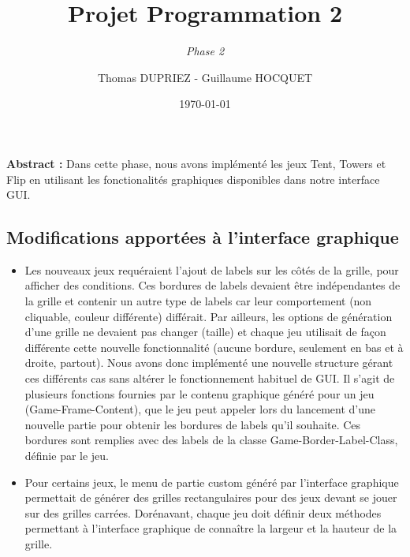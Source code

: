 \documentclass[a4paper]{article}
\title{Projet Programmation 2}
\subtitle{\emph{Phase 2}}
\author{Thomas DUPRIEZ - Guillaume HOCQUET}
\date{\today}
\begin{document}
\maketitle
\textbf{Abstract :} Dans cette phase, nous avons implémenté les jeux Tent, Towers et Flip en utilisant les fonctionalités graphiques disponibles dans notre interface GUI.

\subsection*{Modifications apportées à l'interface graphique}
\begin{itemize}
\item Les nouveaux jeux requéraient l'ajout de labels sur les côtés de la grille, pour afficher des conditions. Ces bordures de labels devaient être indépendantes de la grille et contenir un autre type de labels car leur comportement (non cliquable, couleur différente) différait. Par ailleurs, les options de génération d'une grille ne devaient pas changer (taille) et chaque jeu utilisait de façon différente cette nouvelle fonctionnalité (aucune bordure, seulement en bas et à droite, partout). Nous avons donc implémenté une nouvelle structure gérant ces différents cas sans altérer le fonctionnement habituel de GUI. Il s'agit de plusieurs fonctions fournies par le contenu graphique généré pour un jeu (Game-Frame-Content), que le jeu peut appeler lors du lancement d'une nouvelle partie pour obtenir les bordures de labels qu'il souhaite. Ces bordures sont remplies avec des labels de la classe Game-Border-Label-Class, définie par le jeu.
\item Pour certains jeux, le menu de partie custom généré par l'interface graphique permettait de générer des grilles rectangulaires pour des jeux devant se jouer sur des grilles carrées. Dorénavant, chaque jeu doit définir deux méthodes permettant à l'interface graphique de connaître la largeur et la hauteur de la grille.
\end{itemize}
\end{document}
